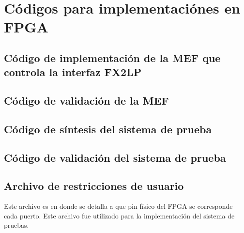 \chapter{Códigos para implementaciónes en FPGA}
\label{ap:vhdl}
	\section*{Código de implementación de la MEF que controla la interfaz FX2LP}
	
	
	\section*{Código de validación de la MEF}
	
	
	\section*{Código de síntesis del sistema de prueba}
	


	\section*{Código de validación del sistema de prueba}
	
	
	\section*{Archivo de restricciones de usuario}
		Este archivo es en donde se detalla a que pin físico del FPGA se corresponde cada puerto. Este archivo fue utilizado para la implementación del sistema de pruebas.
		
		